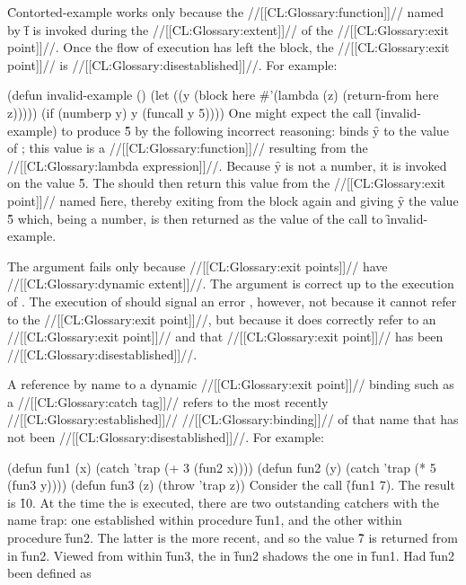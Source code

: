 
\f{Contorted-example} works only because the //[[CL:Glossary:function]]// named by \f{f} is invoked during the //[[CL:Glossary:extent]]// of the  //[[CL:Glossary:exit point]]//. Once the flow of execution has left the block, the //[[CL:Glossary:exit point]]// is //[[CL:Glossary:disestablished]]//.  For example:

\code
 (defun invalid-example ()
   (let ((y (block here #'(lambda (z) (return-from here z)))))
     (if (numberp y) y (funcall y 5)))) \endcode One might expect the call \f{(invalid-example)} to produce \f{5} by the following incorrect reasoning:  binds \f{y} to the value of ; this value is a //[[CL:Glossary:function]]// resulting from the //[[CL:Glossary:lambda expression]]//.  Because \f{y} is not a number, it is invoked on the value \f{5}.  The  should then return this value from the                       //[[CL:Glossary:exit point]]// named \f{here}, thereby exiting from the block again and giving \f{y} the value \f{5} which, being a number, is then returned as the value of the call to \f{invalid-example}.

The argument fails only because //[[CL:Glossary:exit points]]// have  //[[CL:Glossary:dynamic extent]]//.  The argument is correct up to the execution of .  The execution of  should signal an error , however, not because it cannot refer to the //[[CL:Glossary:exit point]]//, but because it does correctly refer to an //[[CL:Glossary:exit point]]// and that  //[[CL:Glossary:exit point]]// has been //[[CL:Glossary:disestablished]]//.

A reference by name to a dynamic //[[CL:Glossary:exit point]]// binding such as a //[[CL:Glossary:catch tag]]// refers to the most recently  //[[CL:Glossary:established]]// //[[CL:Glossary:binding]]// of that name that has not been  //[[CL:Glossary:disestablished]]//.  For example:

\code
 (defun fun1 (x)
   (catch 'trap (+ 3 (fun2 x))))
 (defun fun2 (y)
   (catch 'trap (* 5 (fun3 y))))
 (defun fun3 (z)
   (throw 'trap z)) \endcode Consider the call \f{(fun1 7)}.  The result is \f{10}.  At the time the  is executed, there are two outstanding catchers with the name \f{trap}: one established within procedure \f{fun1}, and the other within procedure \f{fun2}.  The latter is the more recent, and so the value \f{7} is returned from  in \f{fun2}. Viewed from within \f{fun3}, the   in \f{fun2} shadows the one in \f{fun1}. Had \f{fun2} been defined as


